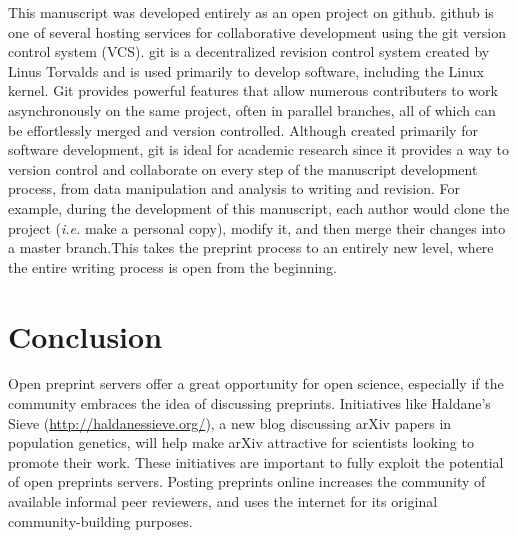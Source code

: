 \documentclass[letterpaper,twocolumn,superscriptaddress,showkeys,longbibliography]{revtex4-1}
\begin{document}
This manuscript was developed entirely as an open project on github. github is
one of several hosting services for collaborative development using the git
version control system (VCS).  git is a decentralized revision control system
created by Linus Torvalds and is used primarily to develop software, including
the Linux kernel. Git provides powerful features that allow numerous contributers to work asynchronously on the same project, often in parallel branches, all of which can be effortlessly merged and version controlled. Although created primarily for software development, git is ideal for academic research since it provides a way to version control and collaborate on every step of the manuscript development process, from data manipulation and analysis to writing and revision. For example, during the development of this manuscript, each author
would clone the project (\emph{i.e.} make a personal copy), modify it, and then merge their changes into a master branch.This takes the preprint process to an entirely new level, where the entire writing process is open from the beginning.

\section{Conclusion}

Open preprint servers offer a great opportunity for open science, especially if
the community embraces the idea of discussing preprints. Initiatives like
Haldane's Sieve (\href{http://haldanessieve.org/}{http://haldanessieve.org/}), a
new blog discussing arXiv papers in population genetics, will help make arXiv
attractive for scientists looking to promote their work. These initiatives are
important to fully exploit the potential of open preprints servers. Posting
preprints online increases the community of available informal peer reviewers,
and uses the internet for its original community-building purposes.
\end{document}
